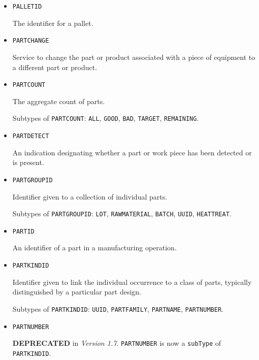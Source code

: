 \begin{itemize}
\item \texttt{PALLET\textunderscore ID}  

The identifier for a pallet.


\item \texttt{PART\textunderscore CHANGE}  

Service to change the part or product associated with a piece of equipment to a different part or product.


\item \texttt{PART\textunderscore COUNT}  

The aggregate count of parts.

Subtypes of \texttt{PART\textunderscore COUNT}: \texttt{ALL}, \texttt{GOOD}, \texttt{BAD}, \texttt{TARGET}, \texttt{REMAINING}.

\item \texttt{PART\textunderscore DETECT}  

An indication designating whether a part or work piece has been detected or is present.


\item \texttt{PART\textunderscore GROUP\textunderscore ID}  

Identifier given to a collection of individual parts. 

Subtypes of \texttt{PART\textunderscore GROUP\textunderscore ID}: \texttt{LOT}, \texttt{RAW\textunderscore MATERIAL}, \texttt{BATCH}, \texttt{UUID}, \texttt{HEAT\textunderscore TREAT}.

\item \texttt{PART\textunderscore ID}  

An identifier of a part in a manufacturing operation.


\item \texttt{PART\textunderscore KIND\textunderscore ID}  

Identifier given to link the individual occurrence to a class of parts, typically distinguished by a particular part design.

Subtypes of \texttt{PART\textunderscore KIND\textunderscore ID}: \texttt{UUID}, \texttt{PART\textunderscore FAMILY}, \texttt{PART\textunderscore NAME}, \texttt{PART\textunderscore NUMBER}.

\item \texttt{PART\textunderscore NUMBER}  

\textbf{DEPRECATED} in \textit{Version 1.7}. \texttt{PART\textunderscore NUMBER} is now a \texttt{subType} of
\texttt{PART\textunderscore KIND\textunderscore ID}.


\end{itemize}
